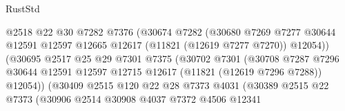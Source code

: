 \begin{lexlean}{RustStd}
\begin{coremodule}
                                      @2518
                                      @22
                                      @30
                                      @7282
                                      @7376
                                      (@30674
                                        @7282
                                        (@30680
                                          @7269
                                          @7277
                                          @30644
                                          @12591
                                          @12597
                                          @12665
                                          @12617
                                          (@11821 (@12619 @7277 @7270))
                                          @12054))
                                      (@30695
                                        @2517
                                        @25
                                        @29
                                        @7301
                                        @7375
                                        (@30702
                                          @7301
                                          (@30708
                                            @7287
                                            @7296
                                            @30644
                                            @12591
                                            @12597
                                            @12715
                                            @12617
                                            (@11821 (@12619 @7296 @7288))
                                            @12054))
                                        (@30409
                                          @2515
                                          @120
                                          @22
                                          @28
                                          @7373
                                          @4031
                                          (@30389
                                            @2515
                                            @22
                                            @7373
                                            (@30906
                                              @2514
                                              @30908
                                              @4037
                                              @7372
                                              @4506
                                              @12341

\end{coremodule}
\end{lexlean}
